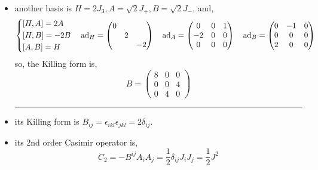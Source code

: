 \begin{itemize}
	\item another basis is $H = 2 J_3, A = \sqrt{2} J_+, B = \sqrt{2} J_-$, and,
	\begin{equation}
		\begin{dcases}
			[H, A] = 2 A \\
			[H, B] = - 2 B \\
			[A, B] = H
		\end{dcases} \quad \mathrm{ad}_H = \begin{pmatrix}
			0 & & \\
			& 2 & \\
			& & - 2
		\end{pmatrix} \quad \mathrm{ad}_A = \begin{pmatrix}
			0 & 0 & 1 \\
			- 2 & 0 & 0 \\
			0 & 0 & 0
		\end{pmatrix} \quad \mathrm{ad}_B = \begin{pmatrix}
			0 & - 1 & 0 \\
			0 & 0 & 0 \\
			2 & 0 & 0
		\end{pmatrix}
	\end{equation}
	so, the Killing form is,
	\begin{equation}
		B = \begin{pmatrix}
			8 & 0 & 0 \\
			0 & 0 & 4 \\
			0 & 4 & 0
		\end{pmatrix}
	\end{equation}
	
	\noindent\rule[0.5ex]{\linewidth}{0.5pt} %
	
	\item its Killing form is $B_{i j} = \epsilon_{i k l} \epsilon_{j k l} = 2 \delta_{i j}$.
	
	\item its 2nd order Casimir operator is,
	\begin{equation}
		C_2 = - B^{i j} A_i A_j = \frac{1}{2} \delta_{i j} J_i J_j = \frac{1}{2} J^2
	\end{equation}
\end{itemize}


